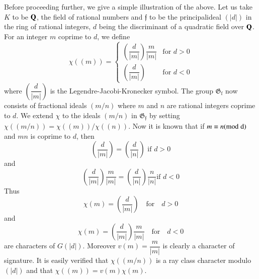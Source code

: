 Before proceeding further, we give a simple illustration of the
above. Let us take $K$ to be $\mathbf{Q}$, the field of rational numbers and
$\mathfrak{f}$ to be the principal\pageoriginale ideal $(|d|)$ in the
ring of rational integers, $d$ being the discriminant of a quadratic
field over $\mathbf{Q}$. For an integer $m$ coprime to $d$, we define 
$$
\chi((m))=
\begin{cases}
\left(\dfrac{d}{|m|}\right)\dfrac{m}{|m|} & \text{for } d>0\\
\left(\dfrac{d}{|m|}\right) & \text{for } d<0
\end{cases}
$$
where $\left(\dfrac{d}{|m|}\right)$ is the Legendre-Jacobi-Kronecker
symbol. The group $\mathfrak{G}_{\text{f}}$ now consists of fractional
ideals $(m/n)$ where $m$ and $n$ are rational integers coprime to
$d$. We extend $\chi$ to the ideals $(m/n)$ in
$\mathfrak{G}_{\mathfrak{f}}$ by setting
$\chi((m/n))=\chi((m))/\chi((n))$. Now it is known that if $m\equiv
n(\rm{mod} \; d)$ and $mn$ is coprime to $d$, then
$$
\left(\frac{d}{|m|}\right)=\left(\frac{d}{|n|}\right)\text{ \ if \ }
d>0
$$
and
$$
\left(\frac{d}{|m|}\right)\frac{m}{|m|}=\left(\frac{d}{|n|}\right)\frac{n}{|n|}\text{
  \ if \ } d<0
$$
Thus 
$$
\chi(m)=\left(\frac{d}{|m|}\right)\quad\text{for}\quad d>0
$$
and
$$
\chi(m)=\left(\frac{d}{|m|}\right)\frac{m}{|m|}\quad\text{for}\quad
d<0
$$
are characters of $G(|d|)$. Moreover $v(m)=\dfrac{m}{|m|}$ is clearly
a character of signature. It is easily verified that $\chi((m/n))$ is
a ray class character modulo $(|d|)$ and that $\chi((m))=v(m)\chi(m)$.

